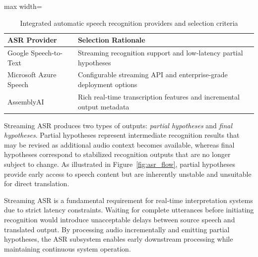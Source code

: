 \begin{table}[!htbp]
  \centering
  \caption[Integrated ASR providers and selection criteria]{Integrated automatic speech recognition providers and selection criteria}
  \label{tab:asr_providers}
  \begin{adjustbox}{max width=\textwidth}
    \begin{tabular}{p{4.5cm} p{11.8cm}}
      \toprule
      \textbf{ASR Provider} & \textbf{Selection Rationale} \\
      \midrule
      Google Speech-to-Text\footnotemark & Streaming recognition support and low-latency partial hypotheses\\
      \midrule
      Microsoft Azure Speech\footnotemark & Configurable streaming API and enterprise-grade deployment options\\
      \midrule
      AssemblyAI\footnotemark & Rich real-time transcription features and incremental output metadata \\
      \bottomrule
    \end{tabular}
  \end{adjustbox}
\end{table}

\addtocounter{footnote}{-2}
\addtocounter{footnote}{1}
\addtocounter{footnote}{1}

Streaming ASR produces two types of outputs: \emph{partial hypotheses} and \emph{final hypotheses}. Partial hypotheses represent intermediate recognition results that may be revised as additional audio context becomes available, whereas final hypotheses correspond to stabilized recognition outputs that are no longer subject to change. As illustrated in Figure~\ref{fig:asr_flow}, partial hypotheses provide early access to speech content but are inherently unstable and unsuitable for direct translation.

Streaming ASR is a fundamental requirement for real-time interpretation systems due to strict latency constraints. Waiting for complete utterances before initiating recognition would introduce unacceptable delays between source speech and translated output. By processing audio incrementally and emitting partial hypotheses, the ASR subsystem enables early downstream processing while maintaining continuous system operation.

